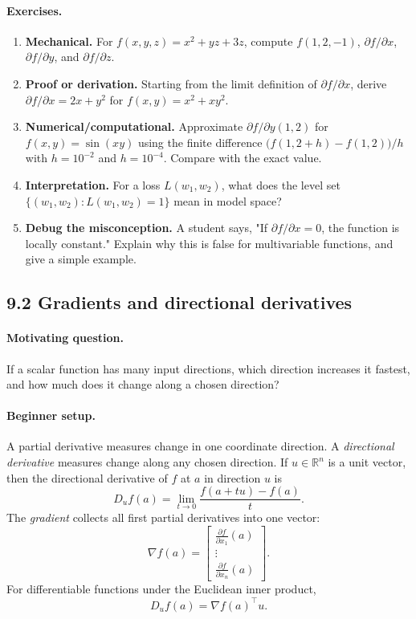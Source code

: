 \paragraph{Exercises.}
\begin{enumerate}[label=\textbf{9.1.\arabic*.}, leftmargin=*]
\item \textbf{Mechanical.} For \(f(x,y,z)=x^2+yz+3z\), compute \(f(1,2,-1)\), \(\partial f/\partial x\), \(\partial f/\partial y\), and \(\partial f/\partial z\).
\item \textbf{Proof or derivation.} Starting from the limit definition of \(\partial f/\partial x\), derive \(\partial f/\partial x=2x+y^2\) for \(f(x,y)=x^2+xy^2\).
\item \textbf{Numerical/computational.} Approximate \(\partial f/\partial y(1,2)\) for \(f(x,y)=\sin(xy)\) using the finite difference \(\bigl(f(1,2+h)-f(1,2)\bigr)/h\) with \(h=10^{-2}\) and \(h=10^{-4}\). Compare with the exact value.
\item \textbf{Interpretation.} For a loss \(L(w_1,w_2)\), what does the level set \(\{(w_1,w_2):L(w_1,w_2)=1\}\) mean in model space?
\item \textbf{Debug the misconception.} A student says, "If \(\partial f/\partial x=0\), the function is locally constant." Explain why this is false for multivariable functions, and give a simple example.
\end{enumerate}

\subsection{9.2 Gradients and directional derivatives}

\paragraph{Motivating question.}
If a scalar function has many input directions, which direction increases it fastest, and how much does it change along a chosen direction?

\paragraph{Beginner setup.}
A partial derivative measures change in one coordinate direction. A \emph{directional derivative} measures change along any chosen direction. If \(u\in\mathbb{R}^n\) is a unit vector, then the directional derivative of \(f\) at \(a\) in direction \(u\) is
\[
D_u f(a)=\lim_{t\to0}\frac{f(a+t u)-f(a)}{t}.
\]
The \emph{gradient} collects all first partial derivatives into one vector:
\[
\nabla f(a)=
\begin{bmatrix}
\frac{\partial f}{\partial x_1}(a)\\
\vdots\\
\frac{\partial f}{\partial x_n}(a)
\end{bmatrix}.
\]
For differentiable functions under the Euclidean inner product,
\[
D_u f(a)=\nabla f(a)^\top u.
\]

